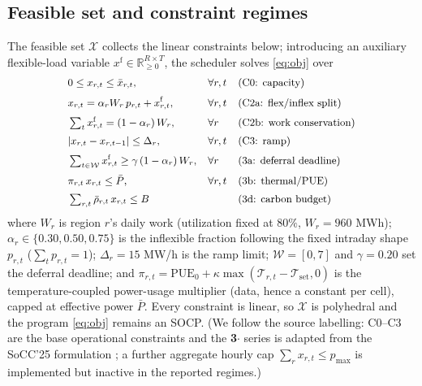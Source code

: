\documentclass[10pt,twocolumn]{article}
\newcommand{\R}{\mathbb{R}}
\begin{document}
\subsection{Feasible set and constraint regimes}\label{sec:constraints}
The feasible set $\mathcal{X}$ collects the linear constraints below; introducing an
auxiliary flexible-load variable $x^{\mathrm f}\in\R^{R\times T}_{\ge0}$, the
scheduler solves \eqref{eq:obj} over
\begin{subequations}\label{eq:feasible}
{\small\setlength{\arraycolsep}{2pt}%
\begin{align}
&0\le x_{r,t}\le\bar x_{r,t}, && \forall r,t
  &&\text{(C0: capacity)}\\[2pt]
&x_{r,t}=\alpha_r W_r\,p_{r,t}+x^{\mathrm f}_{r,t}, && \forall r,t
  &&\text{(C2a: flex/inflex split)}\\[2pt]
&\textstyle\sum_{t} x^{\mathrm f}_{r,t}=(1-\alpha_r)\,W_r, && \forall r
  &&\text{(C2b: work conservation)}\\[2pt]
&\lvert x_{r,t}-x_{r,t-1}\rvert\le\Delta_r, && \forall r,t
  &&\text{(C3: ramp)}\\[2pt]
&\textstyle\sum_{t\in\mathcal W} x^{\mathrm f}_{r,t}\ge\gamma\,(1-\alpha_r)\,W_r,
  && \forall r &&\text{(3a: deferral deadline)}\\[2pt]
&\pi_{r,t}\,x_{r,t}\le\bar P, && \forall r,t
  &&\text{(3b: thermal/PUE)}\\[2pt]
&\textstyle\sum_{r,t}\bar\rho_{r,t}\,x_{r,t}\le B
  && &&\text{(3d: carbon budget)}
\end{align}}
\end{subequations}
where $W_r$ is region $r$'s daily work (utilization fixed at $80\%$, $W_r=960$ MWh);
$\alpha_r\in\{0.30,0.50,0.75\}$ is the inflexible fraction following the fixed
intraday shape $p_{r,t}$ ($\sum_t p_{r,t}=1$); $\Delta_r=15$ MW/h is the ramp limit;
$\mathcal W=[0,7]$ and $\gamma=0.20$ set the deferral deadline; and
$\pi_{r,t}=\mathrm{PUE}_0+\kappa\max(\mathcal T_{r,t}-\mathcal T_{\mathrm{set}},0)$
is the temperature-coupled power-usage multiplier (data, hence a constant per cell),
capped at effective power $\bar P$. Every constraint is linear, so $\mathcal X$ is
polyhedral and the program \eqref{eq:obj} remains an SOCP. (We follow the source
labelling: C0--C3 are the base operational constraints and the \textbf{3$\cdot$}
series is adapted from the SoCC'25 formulation \citep{wijayawardana2025}; a further
aggregate hourly cap $\sum_r x_{r,t}\le p_{\max}$ is implemented but inactive in the
reported regimes.)
\end{document}
